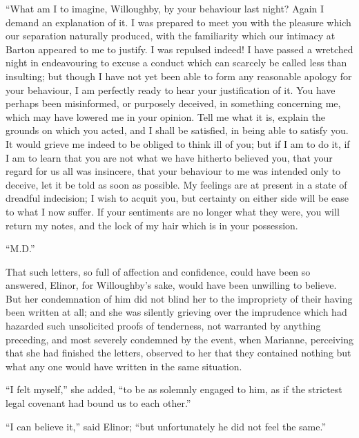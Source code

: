 \documentclass{article}
\begin{document}
\bigskip
     ``What am I to imagine, Willoughby, by your
     behaviour last night?  Again I demand an explanation
     of it.  I was prepared to meet you with the pleasure
     which our separation naturally produced, with the
     familiarity which our intimacy at Barton appeared
     to me to justify.  I was repulsed indeed! I have
     passed a wretched night in endeavouring to excuse
     a conduct which can scarcely be called less than
     insulting; but though I have not yet been able to
     form any reasonable apology for your behaviour,
     I am perfectly ready to hear your justification of
     it.  You have perhaps been misinformed, or purposely
     deceived, in something concerning me, which may have
     lowered me in your opinion.  Tell me what it is,
     explain the grounds on which you acted, and I shall
     be satisfied, in being able to satisfy you.  It
     would grieve me indeed to be obliged to think ill
     of you; but if I am to do it, if I am to learn that
     you are not what we have hitherto believed you, that
     your regard for us all was insincere, that your
     behaviour to me was intended only to deceive, let
     it be told as soon as possible.  My feelings are at
     present in a state of dreadful indecision; I wish
     to acquit you, but certainty on either side will be
     ease to what I now suffer.  If your sentiments are
     no longer what they were, you will return my notes,
     and the lock of my hair which is in your possession.

\medskip
                                             ``M.D.''
\bigskip

That such letters, so full of affection and confidence,
could have been so answered, Elinor, for Willoughby's sake,
would have been unwilling to believe.  But her condemnation
of him did not blind her to the impropriety of their
having been written at all; and she was silently grieving
over the imprudence which had hazarded such unsolicited
proofs of tenderness, not warranted by anything preceding,
and most severely condemned by the event, when Marianne,
perceiving that she had finished the letters, observed to
her that they contained nothing but what any one would
have written in the same situation.

``I felt myself,'' she added, ``to be as solemnly
engaged to him, as if the strictest legal covenant
had bound us to each other.''

``I can believe it,'' said Elinor; ``but unfortunately
he did not feel the same.''
\end{document}
